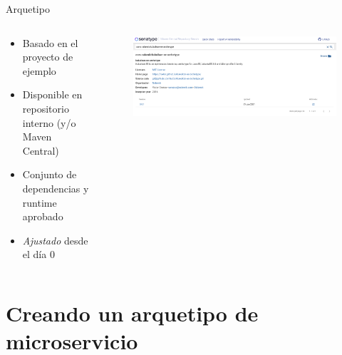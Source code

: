 \documentclass[aspectratio=169]{beamer}
\begin{document}
\begin{frame}{Arquetipo}

\begin{columns}[T] %
\begin{column}[T]{4cm} %
        \begin{itemize}
           \item Basado en el proyecto de ejemplo
           \item Disponible en repositorio interno (y/o Maven Central)
           \item Conjunto de dependencias y runtime aprobado
           \item \textit{Ajustado} desde el día 0
        \end{itemize}
\end{column}
\begin{column}[T]{10cm} %

\begin{figure}
        \centering
        \includegraphics[width=\linewidth]{Images/kukulkan.png}
        \label{fig:archetype}
    \end{figure}
\end{column}
\end{columns}

\end{frame}


{
    \section{Creando un arquetipo de microservicio}
}
\end{document}
